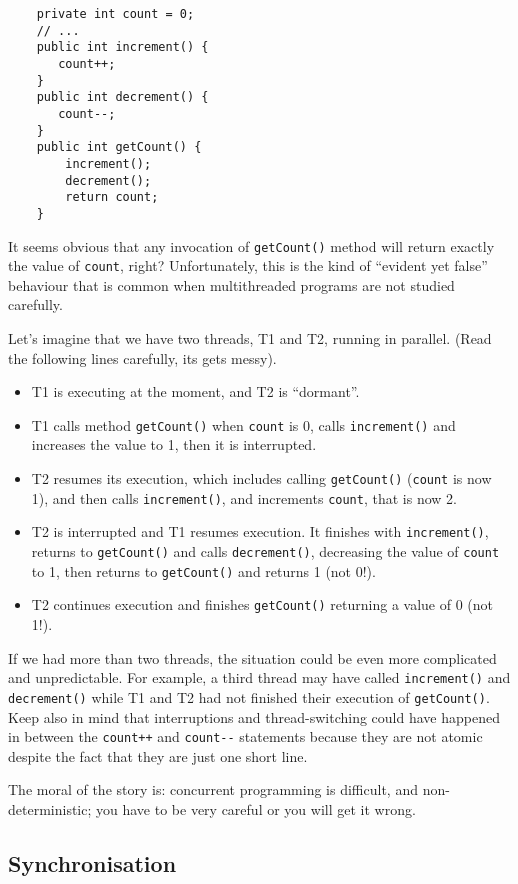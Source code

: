 \begin{verbatim}
    private int count = 0;
    // ...
    public int increment() {
       count++;
    }
    public int decrement() {
       count--;
    }
    public int getCount() {
        increment();
        decrement();
        return count;
    }
\end{verbatim}

It seems obvious that any invocation of \verb+getCount()+ method will return
exactly the value of \verb+count+, right?
Unfortunately, this is the kind of ``evident yet false'' behaviour
that is common when multithreaded programs are not studied carefully. 

Let's imagine that we have two threads, T1 and T2, running in
parallel. (Read the following lines carefully, its gets messy). 
\begin{itemize}
\item T1 is executing at the moment, and T2 is ``dormant''.
\item T1 calls method \verb+getCount()+ when \verb+count+ is 0, calls
\verb+increment()+ and increases the value to 1, 
then it is interrupted.
\item T2 resumes its execution, which includes
calling \verb+getCount()+ (\verb+count+ is now 1), and then calls
\verb+increment()+, and increments \verb+count+, that is now 2.
\item T2 is interrupted and T1 resumes execution. It finishes with
\verb+increment()+, returns to \verb+getCount()+ and calls
\verb+decrement()+, decreasing the value of \verb+count+ to 1, then
returns to \verb+getCount()+ and returns 1 (not 0!).
\item T2 continues execution and finishes \verb+getCount()+ returning a
value of 0 (not 1!).
\end{itemize}

If we had more than two threads, the situation could be even more
complicated and unpredictable. For example, a third thread may have called
\verb+increment()+ and \verb+decrement()+ while T1 and T2 had not
finished their execution of \verb+getCount()+.
Keep also in mind that interruptions and thread-switching
could have happened in between the \verb_count++_ and \verb+count--+
statements because they are not atomic despite the fact that they are
just one short line. 

The moral of the story is: concurrent programming is difficult, and
non-deterministic; you have to be very careful or you will get it
wrong.

\subsection{Synchronisation}
\label{sec:synchronization}


